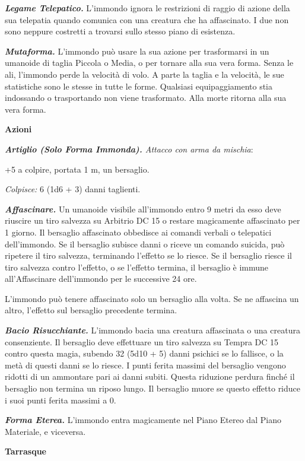\begin{multicols}{2}
\emph{\textbf{Legame Telepatico.}} L'immondo ignora le restrizioni di
raggio di azione della sua telepatia quando comunica con una creatura
che ha affascinato. I due non sono neppure costretti a trovarsi sullo
stesso piano di esistenza.

\emph{\textbf{Mutaforma.}} L'immondo può usare la sua azione per
trasformarsi in un umanoide di taglia Piccola o Media, o per tornare
alla sua vera forma. Senza le ali, l'immondo perde la velocità di volo.
A parte la taglia e la velocità, le sue statistiche sono le stesse in
tutte le forme. Qualsiasi equipaggiamento stia indossando o trasportando
non viene trasformato. Alla morte ritorna alla sua vera forma.

\smallskip\textbf{Azioni}

\emph{\textbf{Artiglio (Solo Forma Immonda).} Attacco con arma da
mischia}:

+5 a colpire, portata 1 m, un bersaglio.

\emph{Colpisce:} 6 (1d6 + 3) danni taglienti.

\emph{\textbf{Affascinare.}} Un umanoide visibile all'immondo entro 9
metri da esso deve riuscire un tiro salvezza su Arbitrio DC 15 o restare
magicamente affascinato per 1 giorno. Il bersaglio affascinato obbedisce
ai comandi verbali o telepatici dell'immondo. Se il bersaglio subisce
danni o riceve un comando suicida, può ripetere il tiro salvezza,
terminando l'effetto se lo riesce. Se il bersaglio riesce il tiro
salvezza contro l'effetto, o se l'effetto termina, il bersaglio è immune
all'Affascinare dell'immondo per le successive 24 ore.

L'immondo può tenere affascinato solo un bersaglio alla volta. Se ne
affascina un altro, l'effetto sul bersaglio precedente termina.

\emph{\textbf{Bacio Risucchiante.}} L'immondo bacia una creatura
affascinata o una creatura consenziente. Il bersaglio deve effettuare un
tiro salvezza su Tempra DC 15 contro questa magia, subendo 32
(5d10 + 5) danni psichici se lo fallisce, o la metà di questi danni se
lo riesce. I punti ferita massimi del bersaglio vengono ridotti di un
ammontare pari ai danni subiti. Questa riduzione perdura finché il
bersaglio non termina un riposo lungo. Il bersaglio muore se questo
effetto riduce i suoi punti ferita massimi a 0.

\emph{\textbf{Forma Eterea.}} L'immondo entra magicamente nel Piano
Etereo dal Piano Materiale, e viceversa.

\textbf{Tarrasque}


\end{multicols}
